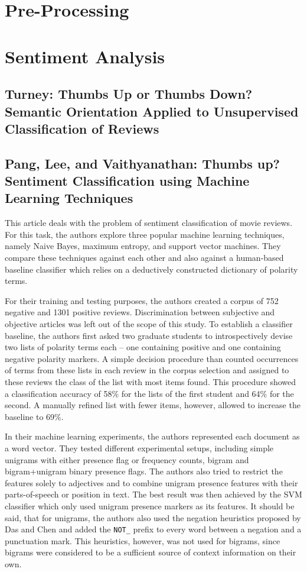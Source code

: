 \documentclass[a4paper,11pt]{article}
\begin{document}
\section{Pre-Processing}

\section{Sentiment Analysis}
\subsection{Turney: Thumbs Up or Thumbs Down? Semantic Orientation Applied to
               Unsupervised Classification of Reviews\cite{Turney-02}}

\subsection{Pang, Lee, and Vaithyanathan: Thumbs up? Sentiment Classification using Machine
                  Learning Techniques\cite{Pang-Lee-02}}

This article deals with the problem of sentiment classification of
movie reviews.  For this task, the authors explore three popular
machine learning techniques, namely Naive Bayes, maximum entropy, and
support vector machines.  They compare these techniques against each
other and also against a human-based baseline classifier which relies
on a deductively constructed dictionary of polarity terms.

For their training and testing purposes, the authors created a corpus
of 752 negative and 1301 positive reviews.  Discrimination between
subjective and objective articles was left out of the scope of this
study.  To establish a classifier baseline, the authors first asked
two graduate students to introspectively devise two lists of polarity
terms each -- one containing positive and one containing negative
polarity markers.  A simple decision procedure than counted
occurrences of terms from these lists in each review in the corpus
selection and assigned to these reviews the class of the list with
most items found.  This procedure showed a classification accuracy of
58\% for the lists of the first student and 64\% for the second.  A
manually refined list with fewer items, however, allowed to increase
the baseline to 69\%.

In their machine learning experiments, the authors represented each
document as a word vector.  They tested different experimental setups,
including simple unigrams with either presence flag or frequency
counts, bigram and bigram+unigram binary presence flags.  The authors
also tried to restrict the features solely to adjectives and to
combine unigram presence features with their parts-of-speech or
position in text.  The best result was then achieved by the SVM
classifier which only used unigram presence markers as its features.
It should be said, that for unigrams, the authors also used the
negation heuristics proposed by Das and Chen \cite{Das-Chen-01} and
added the \texttt{NOT\_} prefix to every word between a negation and a
punctuation mark.  This heuristics, however, was not used for bigrams,
since bigrams were considered to be a sufficient source of context
information on their own.
\end{document}
